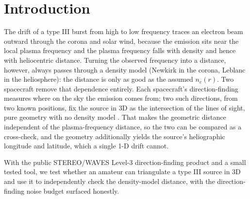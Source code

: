 \documentclass[twocolumn]{aastex631}
\begin{document}
\section{Introduction}
The drift of a type III burst from high to low frequency traces an electron beam outward through the
corona and solar wind, because the emission sits near the local plasma frequency and the plasma
frequency falls with density and hence with heliocentric distance. Turning the observed frequency into
a distance, however, always passes through a density model (Newkirk in the corona, Leblanc in
the heliosphere): the distance is only as good as the assumed $n_e(r)$. Two spacecraft remove that
dependence entirely. Each spacecraft's direction-finding measures where on the sky the emission comes
from; two such directions, from two known positions, fix the source in 3D as the intersection of the
lines of sight, pure geometry with no density model \citep{reiner2009}. That makes the geometric distance
independent of the plasma-frequency distance, so the two can be compared as a cross-check, and
the geometry additionally yields the source's heliographic longitude and latitude, which a single
1-D drift cannot.

With the public STEREO/WAVES Level-3 direction-finding product and a small tested tool, we test whether
an amateur can triangulate a type III source in 3D and use it to independently check the density-model
distance, with the direction-finding noise budget surfaced honestly.
\end{document}
